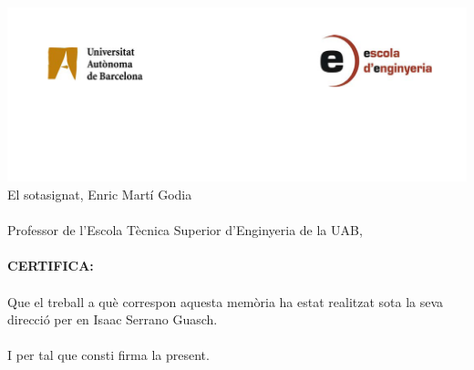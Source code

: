 \includegraphics[width=1.00\textwidth]{./img/logoUAB.png}\\[1cm]  

El sotasignat, Enric Martí Godia \\ \\
Professor de l'Escola Tècnica Superior d'Enginyeria de la UAB, \\ \\
{\bf CERTIFICA:} \\ \\
Que el treball a què correspon aquesta memòria ha estat realitzat sota la
seva direcció per en Isaac Serrano Guasch. \\ \\
I per tal que consti firma la present. \\ \\
